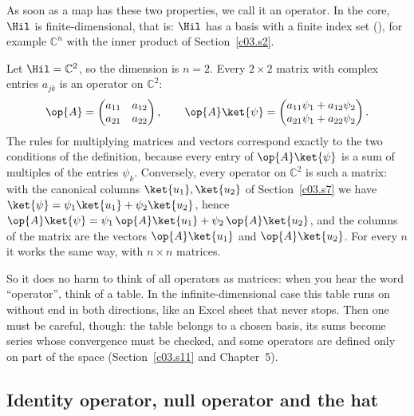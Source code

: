 
As soon as a map has these two properties, we call it an operator. In the core, $\Hil$ is
finite-dimensional, that is: $\Hil$ has a basis with a finite index set (), for
example $\mathbb{C}^n$ with the inner product of Section~\ref{c03.s2}.

\begin{example}\label{c03.ex.matrix}
  Let $\Hil = \mathbb{C}^2$, so the dimension is $n = 2$. Every $2 \times 2$ matrix with
  complex entries $a_{jk}$ is an operator on $\mathbb{C}^2$:
  \begin{equation}\label{c03.eq.matrix}
    \op{A} = \begin{pmatrix} a_{11} & a_{12} \\ a_{21} & a_{22} \end{pmatrix} ,
    \qquad
    \op{A}\ket{\psi} = \begin{pmatrix} a_{11}\psi_1 + a_{12}\psi_2 \\ a_{21}\psi_1 + a_{22}\psi_2 \end{pmatrix} .
  \end{equation}
  The rules for multiplying matrices and vectors correspond exactly to the two conditions of
  the definition, because every entry of $\op{A}\ket{\psi}$ is a sum of multiples of the
  entries $\psi_k$. Conversely, every operator on $\mathbb{C}^2$ is such a matrix: with the
  canonical columns $\ket{u_1}, \ket{u_2}$ of Section~\ref{c03.s7} we have
  $\ket{\psi} = \psi_1 \ket{u_1} + \psi_2 \ket{u_2}$, hence
  $\op{A}\ket{\psi} = \psi_1\, \op{A}\ket{u_1} + \psi_2\, \op{A}\ket{u_2}$, and the columns of
  the matrix are the vectors $\op{A}\ket{u_1}$ and $\op{A}\ket{u_2}$. For every $n$ it works
  the same way, with $n \times n$ matrices.
\end{example}

So it does no harm to think of all operators as matrices: when you hear the word ``operator'',
think of a table. In the infinite-dimensional case this table runs on without end in both
directions, like an Excel sheet that never stops. Then one must be careful, though: the table
belongs to a chosen basis, its sums become series whose convergence must be checked, and some
operators are defined only on part of the space (Section~\ref{c03.s11} and Chapter~5).

\subsection{Identity operator, null operator and the hat}\label{c03.s8.1}

